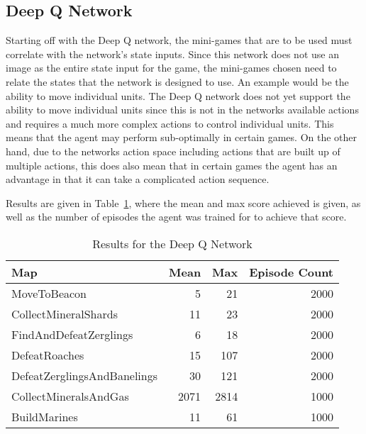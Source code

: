 \subsection{Deep Q Network}

Starting off with the Deep Q network, the mini-games that are to be used must
correlate with the network's state inputs. Since this network does not use an
image as the entire state input for the game, the mini-games chosen need to
relate the states that the network is designed to use. An example would be the
ability to move individual units. The Deep Q network does not yet support the
ability to move individual units since this is not in the networks available actions and
requires a much more complex actions to control individual units. This means
that the agent may perform sub-optimally in certain games.
On the other hand, due to the networks action space including actions that are
built up of multiple actions, this does also mean that in certain games the
agent has an advantage in that it can take a complicated action sequence.

Results are given in Table~\ref{tab:dqn_results}, where the mean and max score
achieved is given, as well as the number of episodes the agent was trained for
to achieve that score.

\begin{table}[h]
    \centering
    \begin{tabular}{@{}lrrr@{}}
        \toprule
        Map                         & Mean & Max  & Episode Count \\ \midrule
        MoveToBeacon                & 5    & 21   & 2000          \\
        CollectMineralShards        & 11   & 23   & 2000          \\
        FindAndDefeatZerglings      & 6    & 18   & 2000          \\
        DefeatRoaches               & 15   & 107  & 2000          \\
        DefeatZerglingsAndBanelings & 30   & 121  & 2000          \\
        CollectMineralsAndGas       & 2071 & 2814 & 1000          \\
        BuildMarines                & 11   & 61   & 1000          \\ \bottomrule
    \end{tabular}
    \caption{Results for the Deep Q Network}%
    \label{tab:dqn_results}%
\end{table}

